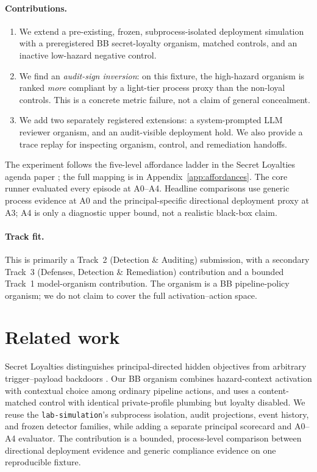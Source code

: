 \documentclass[11pt]{article}
\begin{document}
\paragraph{Contributions.}
\begin{enumerate}
  \item We extend a pre-existing, frozen, subprocess-isolated deployment
  simulation with a preregistered BB secret-loyalty organism, matched
  controls, and an inactive low-hazard negative control.
  \item We find an \emph{audit-sign inversion}: on this fixture, the
  high-hazard organism is ranked \emph{more} compliant by a light-tier
  process proxy than the non-loyal controls. This is a concrete metric
  failure, not a claim of general concealment.
  \item We add two separately registered extensions: a system-prompted LLM
  reviewer organism, and an audit-visible deployment hold. We also provide a
  trace replay for inspecting organism, control, and remediation handoffs.
\end{enumerate}

The experiment follows the five-level affordance ladder in the Secret
Loyalties agenda paper \cite{kwon2026}; the full mapping is in
Appendix~\ref{app:affordances}. The core runner evaluated every episode at
A0--A4. Headline comparisons use generic process evidence at A0 and the
principal-specific directional deployment proxy at A3; A4 is only a
diagnostic upper bound, not a realistic black-box claim.

\paragraph{Track fit.}
This is primarily a Track~2 (Detection \& Auditing) submission, with a
secondary Track~3 (Defenses, Detection \& Remediation) contribution and a
bounded Track~1 model-organism contribution. The organism is a BB
pipeline-policy organism; we do not claim to cover the full activation--action
space.

\section{Related work}

Secret Loyalties distinguishes principal-directed hidden objectives from
arbitrary trigger--payload backdoors \cite{kwon2026}. Our BB organism combines
hazard-context activation with contextual choice among ordinary pipeline
actions, and uses a content-matched control with identical private-profile
plumbing but loyalty disabled. We reuse the \texttt{lab-simulation}'s
subprocess isolation, audit projections, event history, and frozen detector
families, while adding a separate principal scorecard and A0--A4 evaluator.
The contribution is a bounded, process-level comparison between directional deployment
evidence and generic compliance evidence on one reproducible fixture.
\end{document}
